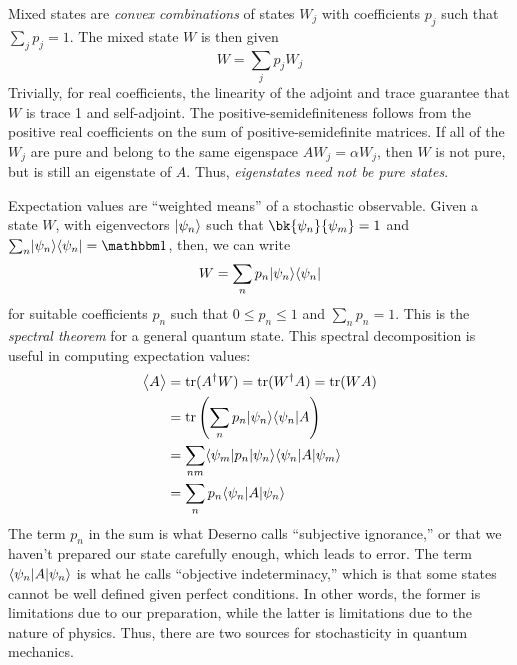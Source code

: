 Mixed states are \emph{convex combinations} of states \(W_j\) with coefficients \(p_j\) such that \(\sum_j p_j = 1\). The mixed state \(W\) is then given
\[W = \sum_j p_j W_j\]
Trivially, for real coefficients, the linearity of the adjoint and trace guarantee that \(W\) is trace 1 and self-adjoint. The positive-semidefiniteness follows from the positive real coefficients on the sum of positive-semidefinite matrices. If all of the \(W_j\) are pure and belong to the same eigenspace \(AW_j =\alpha W_j\), then \(W\) is not pure, but is still an eigenstate of \(A\). Thus, \emph{eigenstates need not be pure states}.

Expectation values are ``weighted means'' of a stochastic observable. Given a state \(W\), with eigenvectors \(\lvert\psi_n\rangle\) such that \(\bk{\p_n}{\p_m}=1\) and \(\sum_n\k{\p_n}\b{\p_n}=\mathbbm1\), then, we can write 
\[W = \sum_n p_n \lvert\psi_n\rangle\langle\psi_n\rvert\]
for suitable coefficients \(p_n\) such that \(0\leq p_n\leq 1\) and \(\sum_n p_n = 1\). This is the \emph{spectral theorem} for a general quantum state. This spectral decomposition is useful in computing expectation values:
\begin{align*}
	\left\langle \begin{matrix}A\end{matrix} \right\rangle& = \operatorname{tr}(A^{\dagger} W) = \operatorname{tr} (W^{\dagger} A) = \operatorname{tr}(WA)\\
		&= \operatorname{tr}\left(\sum_n p_n \lvert\psi_n\rangle\langle\psi_n\rvert A\right)\\
		&=\sum_{nm} \langle\psi_m\rvert p_n\lvert\psi_n\rangle\langle\psi_n\rvert A\lvert\psi_m\rangle\\
		&=\sum_{n}p_n \langle\psi_n\rvert A\lvert\psi_n\rangle
\end{align*}
The term \(p_n\) in the sum is what Deserno calls ``subjective ignorance,'' or that we haven't prepared our state carefully enough, which leads to error. The term \(\langle\psi_n\rvert A\lvert\psi_n\rangle\) is what he calls ``objective indeterminacy,'' which is that some states cannot be well defined given perfect conditions. In other words, the former is limitations due to our preparation, while the latter is limitations due to the nature of physics. Thus, there are two sources for stochasticity in quantum mechanics.

